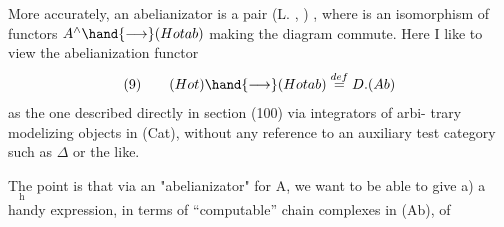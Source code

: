 More accurately,  an abelianizator is a pair (L. ,\hand{$\lambda$} ) ,  where \hand{$\lambda$} is an
isomorphism of functors   $A^{\wedge} \hand{\longrightarrow} (Hotab)$  making the diagram commute.
Here  I like to view the abelianization functor
\[ \text{(9)} \qquad (Hot) \hand{\longrightarrow} (Hotab) \overset{def}{=} D.(Ab) \]
as the one described directly in section (100) via integrators of arbi-%
trary modelizing objects in (Cat),  without any reference to an auxiliary
test category such as $\Delta$ or the like. 

T\(\underset{\text{h}}{\text{h}}\)e point  is that  via an
"abelianizator" for A,  we want to be able to give  a)  a \hand{\uline{\textcolor{black}{simultaneous}}}
handy expression,  in terms of ``computable'' chain complexes in (Ab),  of


